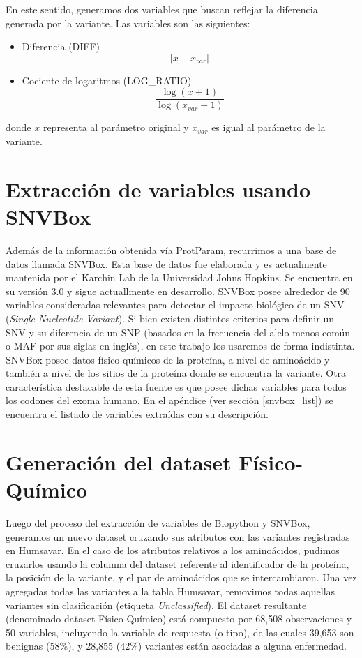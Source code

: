 
En este sentido, generamos dos variables que buscan reflejar la diferencia generada por la variante. Las variables son las siguientes: 

\begin{itemize}
    \item Diferencia (DIFF) 
    $$|x - x_{var}|$$
    \item Cociente de logaritmos (LOG\_RATIO)
    $$\frac{\log{(x + 1)}}{\log{(x_{var} + 1)}}$$  
\end{itemize}

donde $x$ representa al parámetro original y $x_{var}$ es igual al parámetro de la variante.

\section{Extracción de variables usando SNVBox}

Además de la información obtenida vía ProtParam, recurrimos a una base de datos llamada SNVBox. Esta base de datos fue elaborada y es actualmente mantenida por el Karchin Lab de la Universidad Johns Hopkins. Se encuentra en su versión 3.0 y sigue actuallmente en desarrollo. SNVBox posee alrededor de 90 variables consideradas relevantes para detectar el impacto biológico de un SNV (\textit{Single Nucleotide Variant}). Si bien existen distintos criterios para definir un SNV y su diferencia de un SNP (basados en la frecuencia del alelo menos común o MAF por sus siglas en inglés), en este trabajo los usaremos de forma indistinta. SNVBox posee datos físico-químicos de la proteína, a nivel de aminoácido y también a nivel de los sitios de la proteína donde se encuentra la variante. Otra característica destacable de esta fuente es que posee dichas variables para todos los codones del exoma humano. En el apéndice (ver sección \ref{snvbox_list}) se encuentra el listado de variables extraídas con su descripción.

\section{Generación del dataset Físico-Químico}

Luego del proceso del extracción de variables de Biopython y SNVBox, generamos un nuevo dataset cruzando sus atributos con las variantes registradas en Humsavar. En el caso de los atributos relativos a los aminoácidos, pudimos cruzarlos usando la columna del dataset referente al identificador de la proteína, la posición de la variante, y el par de aminoácidos que se intercambiaron. Una vez agregadas todas las variantes a la tabla Humsavar, removimos todas aquellas variantes sin clasificación (etiqueta \textit{Unclassified}). El dataset resultante (denominado dataset Físico-Químico) está compuesto por 68,508 observaciones y 50 variables, incluyendo la variable de respuesta (o tipo), de las cuales 39,653 son benignas (58\%), y 28,855 (42\%) variantes están asociadas a alguna enfermedad. 

